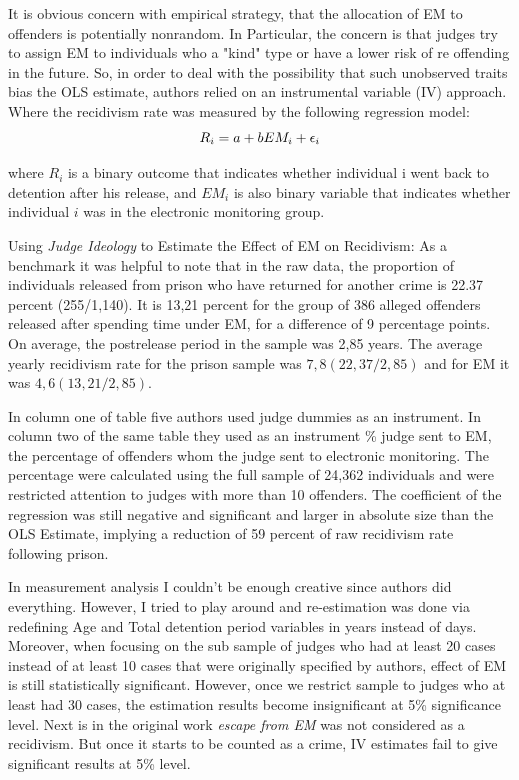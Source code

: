 \documentclass[a4paper,12pt]{article}
\begin{document}
It is obvious concern with empirical strategy, that the allocation of EM to offenders is potentially nonrandom. In Particular, the concern is that judges try to assign EM to individuals who a "kind" type or have a lower risk of re offending in the future. So, in order to deal with the possibility that such unobserved traits bias the OLS estimate, authors relied on an instrumental variable (IV) approach. Where the recidivism rate was measured by the following regression model: 
\begin{equation}
    \centering
    R_i = a + bEM_i + \epsilon_i  
\end{equation}

where $R_i$ is a binary outcome that indicates whether individual i went back to detention after his release, and $EM_i$ is also binary variable that indicates whether individual $i$ was in the electronic monitoring group. 


Using \textit{Judge Ideology} to Estimate the Effect of EM on Recidivism:
As a benchmark it was helpful to note that in the raw data, the proportion of individuals released from prison who have returned for another crime is 22.37 percent (255/1,140). It is 13,21 percent for the group of 386 alleged offenders released after spending time under EM, for a difference of 9 percentage points. On average, the postrelease period in the sample was 2,85 years. The average yearly recidivism rate for the prison sample was $7,8 (22,37/2,85)$ and for EM it was $4,6 (13,21/2,85)$. 

In column one of table five authors used judge dummies as an instrument. In column two of the same table they used as an instrument \% judge sent to EM, the percentage of offenders whom the judge sent to electronic monitoring. The percentage were calculated using the full sample of 24,362 individuals and were restricted attention to judges with more than 10 offenders. The coefficient of the regression was still negative and significant and larger in absolute size than the OLS Estimate, implying a reduction of 59 percent of raw recidivism rate following prison. 

 In measurement analysis I couldn't be enough creative since authors did everything. However, I tried to play around and re-estimation was done via redefining Age and Total detention period variables in years instead of days. Moreover, when focusing on the sub sample of judges who had at least 20 cases instead of at least 10 cases that were originally specified by authors, effect of EM is still statistically significant. However, once we restrict sample to judges who at least had 30 cases, the estimation results become insignificant at 5\% significance level. Next is in the original work \textit{escape from EM} was not considered as a recidivism. But once it starts to be counted as a crime, IV estimates fail to give significant results at 5\% level.
\end{document}
